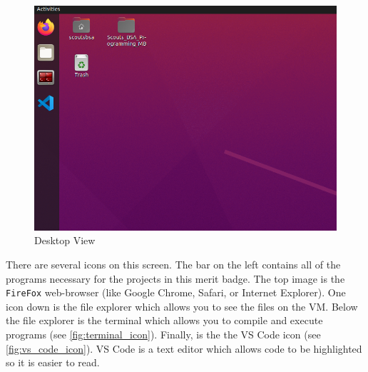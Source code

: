     \begin{figure}[ht]
      \centering
      \includegraphics[width=0.8\linewidth]{desktop.png}
      \caption{Desktop View}
      \label{fig:desktop_view}
    \end{figure}

    \FloatBarrier

    There are several icons on this screen.
    The bar on the left contains all of the programs necessary for the projects in this merit badge.
    The top image is the \texttt{FireFox} web-browser (like Google Chrome, Safari, or Internet Explorer).
    One icon down is the file explorer which allows you to see the files on the VM.
    Below the file explorer is the terminal which allows you to compile and execute programs (see \autoref{fig:terminal_icon}).
    Finally, is the the VS Code icon (see \autoref{fig:vs_code_icon}).
    VS Code is a text editor which allows code to be highlighted so it is easier to read.

